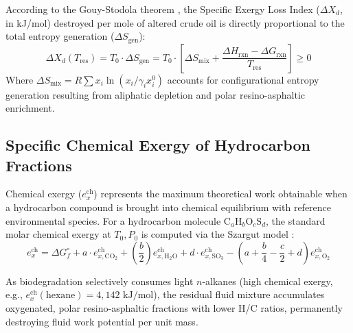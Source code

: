 \documentclass[review,12pt]{elsarticle}
\begin{document}
According to the Gouy-Stodola theorem \citep{gouy1889energie, stodola1910steam, bejan1982entropy, bejan2016advanced}, the Specific Exergy Loss Index ($\Delta X_d$, in kJ/mol) destroyed per mole of altered crude oil is directly proportional to the total entropy generation ($\Delta S_{\text{gen}}$):
\begin{equation}
    \Delta X_d(T_{\text{res}}) = T_0 \cdot \Delta S_{\text{gen}} = T_0 \cdot \left[ \Delta S_{\text{mix}} + \frac{\Delta H_{\text{rxn}} - \Delta G_{\text{rxn}}}{T_{\text{res}}} \right] \ge 0
\end{equation}
Where $\Delta S_{\text{mix}} = R \sum x_i \ln(x_i / \gamma_i x_i^0)$ accounts for configurational entropy generation resulting from aliphatic depletion and polar resino-asphaltic enrichment.

\subsection{Specific Chemical Exergy of Hydrocarbon Fractions}
Chemical exergy ($e_x^{\text{ch}}$) represents the maximum theoretical work obtainable when a hydrocarbon compound is brought into chemical equilibrium with reference environmental species. For a hydrocarbon molecule $\text{C}_a\text{H}_b\text{O}_c\text{S}_d$, the standard molar chemical exergy at $T_0, P_0$ is computed via the Szargut model \citep{kotas2013exergy, dincer2021exergy}:
\begin{equation}
    e_x^{\text{ch}} = \Delta G_f^\circ + a \cdot e_{x, \text{CO}_2}^{\text{ch}} + \left(\frac{b}{2}\right) e_{x, \text{H}_2\text{O}}^{\text{ch}} + d \cdot e_{x, \text{SO}_3}^{\text{ch}} - \left( a + \frac{b}{4} - \frac{c}{2} + d \right) e_{x, \text{O}_2}^{\text{ch}}
\end{equation}

As biodegradation selectively consumes light $n$-alkanes (high chemical exergy, e.g., $e_x^{\text{ch}}(\text{hexane}) = 4,142\text{ kJ/mol}$), the residual fluid mixture accumulates oxygenated, polar resino-asphaltic fractions with lower H/C ratios, permanently destroying fluid work potential per unit mass.
\end{document}
